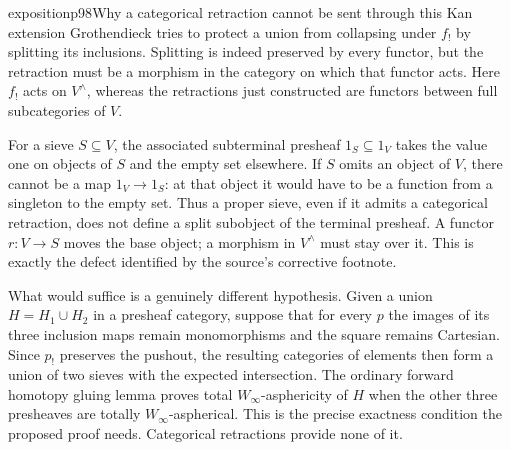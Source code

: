 \begin{dcomment}{exposition}{p98}{Why a categorical retraction cannot be sent through this Kan extension}
Grothendieck tries to protect a union from collapsing under $f_!$ by splitting its inclusions. Splitting is indeed preserved by every functor, but the retraction must be a morphism in the category on which that functor acts. Here $f_!$ acts on $V^{\wedge}$, whereas the retractions just constructed are functors between full subcategories of $V$.

For a sieve $S\subseteq V$, the associated subterminal presheaf $1_S\subseteq1_V$ takes the value one on objects of $S$ and the empty set elsewhere. If $S$ omits an object of $V$, there cannot be a map $1_V\to1_S$: at that object it would have to be a function from a singleton to the empty set. Thus a proper sieve, even if it admits a categorical retraction, does not define a split subobject of the terminal presheaf. A functor $r:V\to S$ moves the base object; a morphism in $V^{\wedge}$ must stay over it. This is exactly the defect identified by the source's corrective footnote.

What would suffice is a genuinely different hypothesis. Given a union $H=H_1\cup H_2$ in a presheaf category, suppose that for every $p$ the images of its three inclusion maps remain monomorphisms and the square remains Cartesian. Since $p_!$ preserves the pushout, the resulting categories of elements then form a union of two sieves with the expected intersection. The ordinary forward homotopy gluing lemma proves total $W_\infty$-asphericity of $H$ when the other three presheaves are totally $W_\infty$-aspherical. This is the precise exactness condition the proposed proof needs. Categorical retractions provide none of it.
\end{dcomment}

